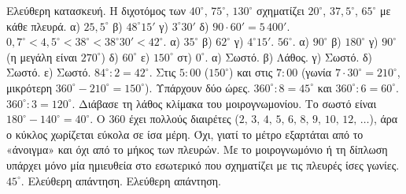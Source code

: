  Ελεύθερη κατασκευή. Η διχοτόμος των $40^\circ$, $75^\circ$, $130^\circ$ σχηματίζει $20^\circ$, $37{,}5^\circ$, $65^\circ$ με κάθε πλευρά.
 α) $25{,}5^\circ$ \quad β) $48^\circ15'$ \quad γ) $3^\circ30'$ \quad δ) $90\cdot60'=5\,400'$.
 $0{,}7^\circ<4{,}5^\circ<38^\circ<38^\circ30'<42^\circ$.
 α) $35^\circ$ \quad β) $62^\circ$ \quad γ) $4^\circ15'$.
 $56^\circ$.
 α) $90^\circ$ \quad β) $180^\circ$ \quad γ) $90^\circ$ (η μεγάλη είναι $270^\circ$) \quad δ) $60^\circ$ \quad ε) $150^\circ$ \quad στ) $0^\circ$.
 α) Σωστό. β) Λάθος. γ) Σωστό. δ) Σωστό. ε) Σωστό.
 $84^\circ:2=42^\circ$.
 Στις $5{:}00$ ($150^\circ$) και στις $7{:}00$ (γωνία $7\cdot30^\circ=210^\circ$, μικρότερη $360^\circ-210^\circ=150^\circ$). Υπάρχουν δύο ώρες.
 $360^\circ:8=45^\circ$ και $360^\circ:6=60^\circ$.
 $360^\circ:3=120^\circ$.
 Διάβασε τη λάθος κλίμακα του μοιρογνωμονίου. Το σωστό είναι $180^\circ-140^\circ=40^\circ$.
 Ο $360$ έχει πολλούς διαιρέτες ($2,\,3,\,4,\,5,\,6,\,8,\,9,\,10,\,12,\,\dots$), άρα ο κύκλος χωρίζεται εύκολα σε ίσα μέρη.
 Όχι, γιατί το μέτρο εξαρτάται από το «άνοιγμα» και όχι από το μήκος των πλευρών.
 Με το μοιρογνωμόνιο ή τη δίπλωση υπάρχει μόνο μία ημιευθεία στο εσωτερικό που σχηματίζει με τις πλευρές ίσες γωνίες.
 $45^\circ$.
 Ελεύθερη απάντηση.
 Ελεύθερη απάντηση.
